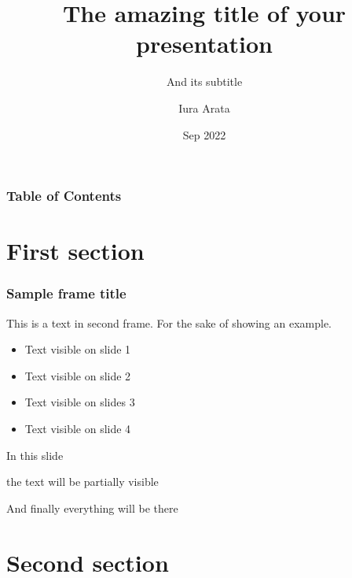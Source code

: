 \documentclass[11pt, fontset=windows, ignorenonframetext]{beamer}  %
\title[]{The amazing title of your presentation}
\subtitle{And its subtitle}
\author[Iura Arata] %
{Iura Arata}
\institute[HKUST(GZ)] %
{
FinTech Thrust, Society Hub\\[0.3em]
The Hong Kong University of Science and Technology (Guangzhou)
}
\date[Sep 2022] %
{Sep 2022}
\begin{document}
\addtocounter{framenumber}{-1}

\frame{\titlepage}


\begin{frame}
\frametitle{Table of Contents}
\tableofcontents
\end{frame}


\section{First section}

\begin{frame}
\frametitle{Sample frame title}
This is a text in second frame. For the sake of showing an example.

\begin{itemize}
    \item<1-> Text visible on slide 1
    \item<2-> Text visible on slide 2
    \item<3> Text visible on slides 3
    \item<4-> Text visible on slide 4
\end{itemize}
\end{frame}



\begin{frame}
In this slide \pause

the text will be partially visible \pause

And finally everything will be there
\end{frame}

\section{Second section}
\end{document}
